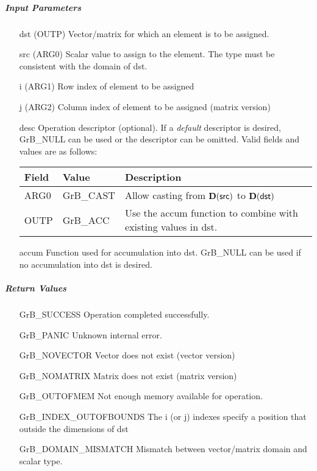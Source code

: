 \subparagraph{Input Parameters}

\begin{itemize}[leftmargin=1.1in]
    \item[{\sf dst}]   (OUTP) Vector/matrix for which an element is to be assigned.
    \item[{\sf src}]   (ARG0) Scalar value to assign to the element.  The type must
                              be consistent with the domain of dst.
    \item[{\sf i}]     (ARG1) Row index of element to be assigned
    \item[{\sf j}]     (ARG2) Column index of element to be assigned (matrix version)

    \item[{\sf desc}]   Operation descriptor (optional). If a
    \emph{default} descriptor is desired, {\sf GrB\_NULL} can be
    used or the descriptor can be omitted.  Valid fields and values are as follows: \\
    \begin{tabular}{lll}
    Field  & Value & Description \\
    \hline
    {\sf ARG0} & {\sf GrB\_CAST} & Allow casting from $\bold{D}({\sf src})$ to $\bold{D}({\sf dst})$ \\
    {\sf OUTP} & {\sf GrB\_ACC}  & Use the {\sf accum} function to combine with existing values in {\sf dst}.\\
    \end{tabular}

    \item[{\sf accum}]  Function used for accumulation into dst.  {\sf GrB\_NULL}
                        can be used if no accumulation into dst is desired.
\end{itemize}

\subparagraph{Return Values}

\begin{itemize}[leftmargin=2.1in]
\item[{\sf GrB\_SUCCESS}]             Operation completed successfully.
\item[{\sf GrB\_PANIC}]               Unknown internal error.
\item[{\sf GrB\_NOVECTOR}]            Vector does not exist (vector version)
\item[{\sf GrB\_NOMATRIX}]            Matrix does not exist (matrix version)
\item[{\sf GrB\_OUTOFMEM}]            Not enough memory available for operation.
\item[{\sf GrB\_INDEX\_OUTOFBOUNDS}]  The i (or j) indexes specify a position that outside the dimensions of dst
\item[{\sf GrB\_DOMAIN\_MISMATCH}]    Mismatch between vector/matrix domain and scalar type.
\end{itemize}

